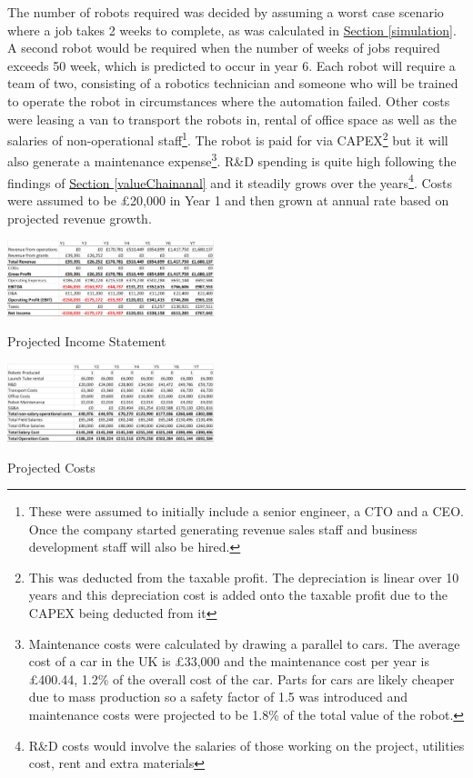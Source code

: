 \documentclass[11pt]{article}		%
\newcommand{\sectref}[1]{\hyperref[#1]{Section \ref*{#1}}}     %
\begin{document}
    \hspace*{2ex}The number of robots required was decided by assuming a worst case scenario where a job takes 2 weeks to complete, as was calculated in \sectref{simulation}. A second robot would be required when the number of weeks of jobs required exceeds 50 week, which is predicted to occur in year 6. Each robot will require a team of two, consisting of a robotics technician and someone who will be trained to operate the robot in circumstances where the automation failed. Other costs were leasing a van to transport the robots in, rental of office space as well as the salaries of non-operational staff\footnote{These were assumed to initially include a senior engineer, a CTO and a CEO. Once the company started generating revenue sales staff and business development staff will also be hired.}. The robot is paid for via CAPEX\footnote{This was deducted from the taxable profit. The depreciation is linear over 10 years and this depreciation cost is added onto the taxable profit due to the CAPEX being deducted from it} but it will also generate a maintenance expense\footnote{Maintenance costs were calculated by drawing a parallel to cars. The average cost of a car in the UK is £33,000 and the maintenance cost per year is £400.44, 1.2\% of the overall cost of the car. Parts for cars are likely cheaper due to mass production so a safety factor of 1.5 was introduced and maintenance costs were projected to be 1.8\% of the total value of the robot.}.  R\&D spending is quite high following the findings of \sectref{valueChainanal} and it steadily grows over the years\footnote{R\&D costs would involve the salaries of those working on the project, utilities cost, rent and extra materials}. Costs were assumed to be £20,000 in Year 1 and then grown at annual rate based on projected revenue growth.
    \begin{table}[h]
					\centering
				\begin{multicols}{2}
				    
				\includegraphics[width=0.45\textwidth]{revenue projections 7 years v1.png}
					\caption{Projected Income Statement}
					\label{forecast_PL}
			
		            \columnbreak
		     
					\centering
					\includegraphics[width=0.45\textwidth]{cost projections 7 years v1.png}
					\caption{Projected Costs}
					\label{forecast_costs}
						\end{multicols}
				\end{table}
\end{document}

